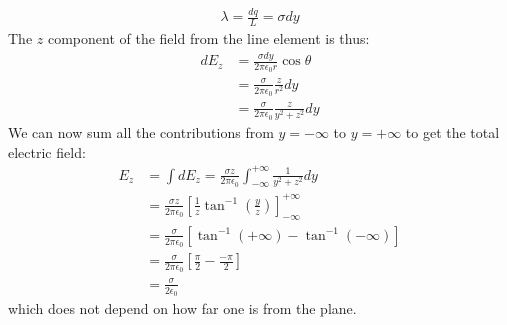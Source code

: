 \begin{solution}
\begin{align*}
\lambda = \frac{dq}{L}=\sigma dy
\end{align*}
The $z$ component of the field from the line element is thus:
\begin{align*}
dE_z &= \frac{\sigma dy}{2\pi\epsilon_0 r}\cos\theta \\
&=\frac{\sigma}{2\pi\epsilon_0} \frac{z}{r^2} dy\\
&=\frac{\sigma}{2\pi\epsilon_0} \frac{z}{y^2+z^2} dy
\end{align*}
We can now sum all the contributions from $y=-\infty$ to $y=+\infty$ to get the total electric field:
\begin{align*}
E_z &= \int dE_z=\frac{\sigma z}{2\pi\epsilon_0}\int_{-\infty}^{+\infty} \frac{1}{y^2+z^2} dy\\
&=\frac{\sigma z}{2\pi\epsilon_0}\left[ \frac{1}{z}\tan^{-1}\left(\frac{y}{z}\right) \right]_{-\infty}^{+\infty}\\
&=\frac{\sigma}{2\pi\epsilon_0}\left[ \tan^{-1}(+\infty) - \tan^{-1}(-\infty) \right]\\
&=\frac{\sigma}{2\pi\epsilon_0}\left[ \frac{\pi}{2}- \frac{-\pi}{2} \right]\\
&=\frac{\sigma}{2\epsilon_0}
\end{align*}
which does not depend on how far one is from the plane.
\end{solution}

